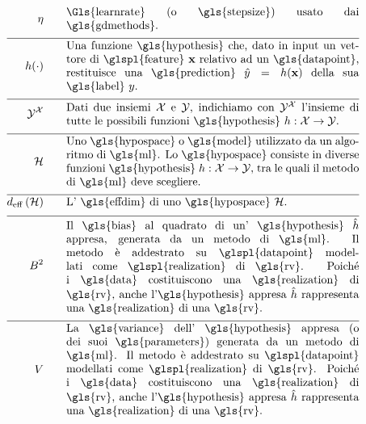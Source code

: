 \begin{align}
\lrate  \quad\quad & \parbox{.75\textwidth}{\Gls{learnrate} (o \gls{stepsize}) usato dai \gls{gdmethods}.}  \nonumber \\[2mm] \hline \nonumber\\[-5mm]
	\hypothesis(\cdot)  \quad\quad &\parbox{.75\textwidth}{Una funzione \gls{hypothesis} che, dato in input un vettore di \glspl{feature} $\featurevec$ relativo ad un \gls{datapoint}, restituisce una \gls{prediction} $\hat{\truelabel}=\hypothesis(\featurevec)$ della sua \gls{label} $\truelabel$.}  	 \nonumber \\[2mm] \hline \nonumber\\[-5mm]
	 \labelspace^{\featurespace} \quad\quad & \parbox{.75\textwidth}{Dati due insiemi $\featurespace$ e $\labelspace$, indichiamo con $ \labelspace^{\featurespace}$ l'insieme di tutte le possibili funzioni \gls{hypothesis} $\hypothesis: \featurespace \rightarrow \labelspace$.} 	 \nonumber \\[2mm] \hline \nonumber\\[-5mm]
	\hypospace  \quad\quad & \parbox{.75\textwidth}{Uno \gls{hypospace} o \gls{model} utilizzato da un algoritmo di \gls{ml}. 
		Lo \gls{hypospace} consiste in diverse funzioni \gls{hypothesis} $\hypothesis: \featurespace \rightarrow \labelspace$, tra le quali il metodo di \gls{ml} deve scegliere.}   \nonumber \\[2mm] \hline \nonumber\\[-5mm]
	\effdim{\hypospace}  \quad\quad & \parbox{.75\textwidth}{L' \gls{effdim} di uno \gls{hypospace} $\hypospace$.}   \nonumber \\[2mm] \hline \nonumber\\[-5mm]
	\biasterm^2 \quad\quad &\parbox{.75\textwidth}{
		Il \gls{bias} al quadrato di un' \gls{hypothesis} $\learnthypothesis$ 
		appresa, generata da un metodo di \gls{ml}. Il metodo è addestrato su \glspl{datapoint} 
		modellati come \glspl{realization} di \gls{rv}. Poiché i \gls{data} costituiscono una \gls{realization} 
		di \gls{rv}, anche l'\gls{hypothesis} appresa $\learnthypothesis$ rappresenta una \gls{realization} 
		di una \gls{rv}.} \nonumber  \nonumber \\[2mm] \hline \nonumber\\[-5mm]
	\varianceterm \quad\quad &\parbox{.75\textwidth}{La \gls{variance} dell' 
		\gls{hypothesis} appresa (o dei suoi \gls{parameters}) generata da un metodo di \gls{ml}. 
		Il metodo è addestrato su \glspl{datapoint} 
		modellati come \glspl{realization} di \gls{rv}. Poiché i \gls{data} costituiscono una \gls{realization} 
		di \gls{rv}, anche l'\gls{hypothesis} appresa $\learnthypothesis$ rappresenta una \gls{realization} 
		di una \gls{rv}.} \nonumber \nonumber %
\end{align}     

